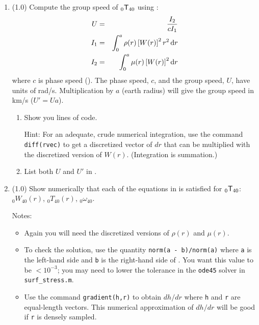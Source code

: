 \documentclass[11pt,titlepage,fleqn]{article}
\newcommand{\tnl}[2]{\mbox{$_{#1}\ssT_{#2}$}}
\begin{document}
\begin{enumerate}
\item (1.0) Compute the group speed of \tnl{0}{40} using \citep[][Eq. 11.67]{DT}:
%
\begin{eqnarray}
U &=& \frac{I_2}{cI_1}
\label{group}
\\
I_1 &=& \int_0^a \rho(r) \left[W(r)\right]^2 r^2 \, \mathrm{d} r
\\
I_2 &=& \int_0^a \mu(r) \left[W(r)\right]^2 \mathrm{d} r
\end{eqnarray}
%
where $c$ is phase speed (). %
The phase speed, $c$, and the group speed, $U$, have units of rad/s. Multiplication by $a$ (earth radius) will give the group speed in km/s ($U' = Ua$).
%
\begin{enumerate}
\item Show you lines of code.

Hint: For an adequate, crude numerical integration, use the command \verb+diff(rvec)+ to get a discretized vector of $dr$ that can be multiplied with the discretized version of $W(r)$. (Integration is summation.)

\item List both $U$ and $U'$ in .
\end{enumerate}

\label{prob:0T40_cubic_group}

\pagebreak
\item (1.0) Show numerically that each of the equations in  is satisfied for \tnl{0}{40}: $_0W_{40}(r)$, $_0T_{40}(r)$, $_0\omega_{40}$.

Notes:
%
\begin{itemize}
\item Again you will need the discretized versions of $\rho(r)$ and $\mu(r)$.

\item To check the solution, use the quantity \verb+norm(a - b)/norm(a)+ where \verb+a+ is the left-hand side and \verb+b+ is the right-hand side of . You want this value to be $< 10^{-3}$; you may need to lower the tolerance in the \verb+ode45+ solver in \verb+surf_stress.m+.

\item Use the command \verb+gradient(h,r)+ to obtain $dh/dr$ where \verb+h+ and \verb+r+ are equal-length vectors. This numerical approximation of $dh/dr$ will be good if \verb+r+ is densely sampled.
\end{itemize}


\end{enumerate}
\end{document}
